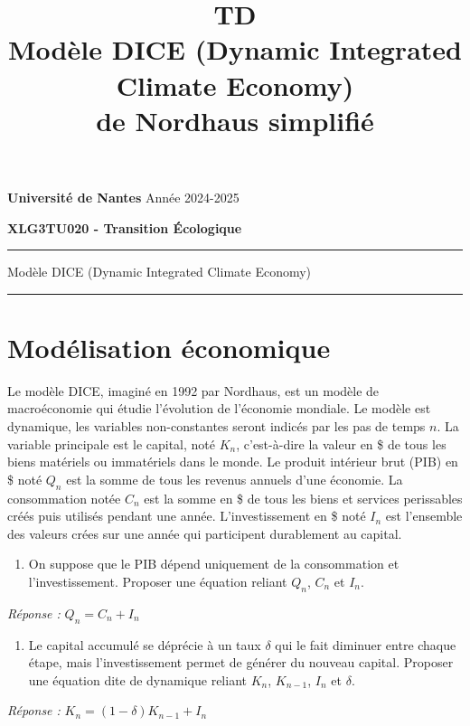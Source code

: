 \documentclass[12pt,a4paper]{article}
\title{TD \\Modèle 
DICE (Dynamic Integrated Climate Economy) \\
de Nordhaus simplifié }
\newcommand{\rep}[1]{\textit{Réponse :} #1 \\}
\theoremstyle{remark}
\begin{document}
	\noindent
	{\textbf{Universit\'e de Nantes} \hfill Ann\'ee 2024-2025}\\
	{\textbf{XLG3TU020 - Transition Écologique}\\
		\medskip
\medskip
\medskip
\medskip

		
		\hrule
		\begin{center} {\Large \sc Modèle DICE (Dynamic Integrated Climate Economy)}
		\end{center}
		\hrule
		\bigskip
		


\medskip
\medskip


\section*{\sc Modélisation économique}

Le modèle DICE, imaginé en 1992 par Nordhaus, est un modèle de macroéconomie qui étudie l'évolution de l'économie mondiale.
Le modèle est dynamique, les variables non-constantes seront indicés par les pas de temps $n$.
La variable principale est le capital, noté $K_n$, c'est-à-dire la valeur en \$ de tous les biens matériels ou immatériels dans le monde.
Le produit intérieur brut (PIB) en \$ noté $Q_n$ est la somme de tous les revenus annuels d'une économie.
La consommation notée $C_n$ est la somme en \$ de tous les biens et services perissables créés puis utilisés pendant une année.
L'investissement en \$ noté $I_n$ est l'ensemble des valeurs crées sur une année qui participent durablement au capital.

\begin{enumerate}
\item On suppose que le PIB dépend uniquement de la consommation et l'investissement. Proposer une équation reliant $Q_n$, $C_n$ et $I_n$.
\end{enumerate}
\rep{ $Q_{n}=C_n + I_n$ }
\begin{enumerate}[resume]
\item  Le capital accumulé se déprécie à un taux $\delta$ qui le fait diminuer entre chaque étape, mais l'investissement permet de générer du nouveau capital. Proposer une équation dite de dynamique reliant $K_{n}$, $K_{n-1}$, $I_n$ et $\delta$.
\end{enumerate}
\rep{ $K_{n}=(1-\delta)K_{n-1}+I_n$ }

}
\end{document}
